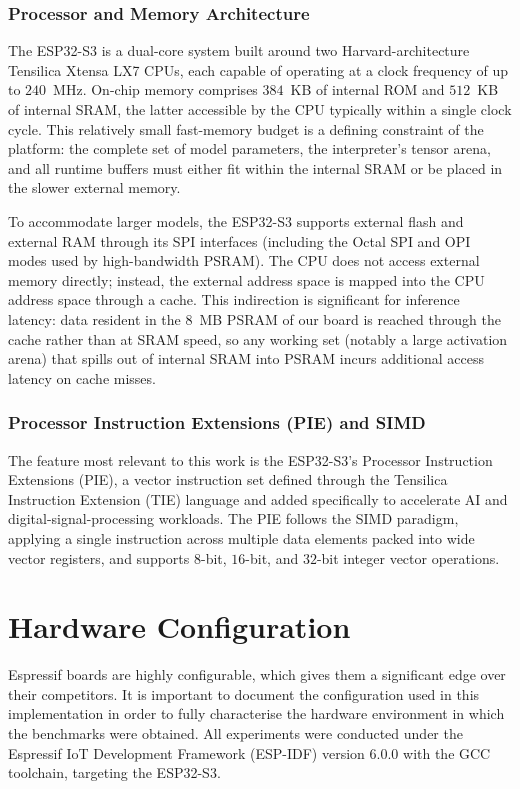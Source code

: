 \documentclass[12pt,DIV16,BCOR12mm,a4paper,footinclude=false,headinclude,parskip=half-,twoside,openright,cleardoublepage=empty,toc=index,bibliography=totoc,listof=totoc]{scrreprt}
\numberwithin{equation}{chapter}
\begin{document}
    \subsubsection{Processor and Memory Architecture}

    The ESP32-S3 is a dual-core system built around two Harvard-architecture
    Tensilica Xtensa\textregistered{} LX7 CPUs, each capable of operating at a clock
    frequency of up to $240$~MHz. On-chip memory comprises $384$~KB of internal ROM
    and $512$~KB of internal SRAM, the latter accessible by the CPU typically within
    a single clock cycle. This relatively small fast-memory budget is a defining
    constraint of the platform: the complete set of model parameters, the
    interpreter's tensor arena, and all runtime buffers must either fit within the
    internal SRAM or be placed in the slower external memory.

    To accommodate larger models, the ESP32-S3 supports external flash and external
    RAM through its SPI interfaces (including the Octal SPI and OPI modes used by
    high-bandwidth PSRAM). The CPU does not access
    external memory directly; instead, the external address space is mapped into the
    CPU address space through a cache. This indirection is
    significant for inference latency: data resident in the $8$~MB PSRAM of our board
    is reached through the cache rather than at SRAM speed, so any working set
    (notably a large activation arena) that spills out of internal SRAM into PSRAM
    incurs additional access latency on cache misses.

  
    \subsubsection{Processor Instruction Extensions (PIE) and SIMD}
    The feature most relevant to this work is the ESP32-S3's Processor Instruction
    Extensions (PIE), a vector instruction set defined through the Tensilica
    Instruction Extension (TIE) language and added specifically to accelerate AI and
    digital-signal-processing workloads. The PIE follows the SIMD paradigm, applying a
    single instruction across multiple data elements packed into wide vector
    registers, and supports $8$-bit, $16$-bit, and $32$-bit integer vector operations.

    \section{Hardware Configuration}
    Espressif boards are highly configurable, which gives them a significant edge over
    their competitors. It is important to document the configuration used in this
    implementation in order to fully characterise the hardware environment in which the
    benchmarks were obtained. All experiments were conducted under the Espressif IoT
    Development Framework (ESP-IDF) version $6.0.0$ with the GCC toolchain, targeting the
    ESP32-S3.
\end{document}
